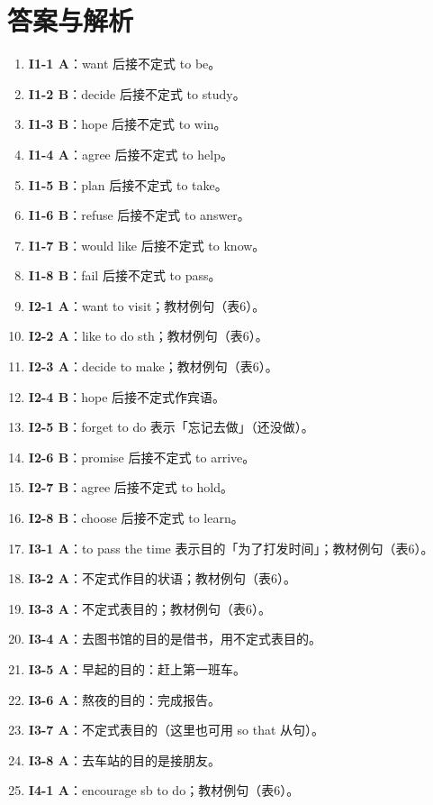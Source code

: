 \documentclass[11pt,a4paper]{ctexart}
\begin{document}
\section*{答案与解析}
\small
\begin{enumerate}[leftmargin=1.6em,itemsep=2pt]
\item \textbf{I1-1 A}：want 后接不定式 to be。
\item \textbf{I1-2 B}：decide 后接不定式 to study。
\item \textbf{I1-3 B}：hope 后接不定式 to win。
\item \textbf{I1-4 A}：agree 后接不定式 to help。
\item \textbf{I1-5 B}：plan 后接不定式 to take。
\item \textbf{I1-6 B}：refuse 后接不定式 to answer。
\item \textbf{I1-7 B}：would like 后接不定式 to know。
\item \textbf{I1-8 B}：fail 后接不定式 to pass。
\item \textbf{I2-1 A}：want to visit；教材例句（表6）。
\item \textbf{I2-2 A}：like to do sth；教材例句（表6）。
\item \textbf{I2-3 A}：decide to make；教材例句（表6）。
\item \textbf{I2-4 B}：hope 后接不定式作宾语。
\item \textbf{I2-5 B}：forget to do 表示「忘记去做」（还没做）。
\item \textbf{I2-6 B}：promise 后接不定式 to arrive。
\item \textbf{I2-7 B}：agree 后接不定式 to hold。
\item \textbf{I2-8 B}：choose 后接不定式 to learn。
\item \textbf{I3-1 A}：to pass the time 表示目的「为了打发时间」；教材例句（表6）。
\item \textbf{I3-2 A}：不定式作目的状语；教材例句（表6）。
\item \textbf{I3-3 A}：不定式表目的；教材例句（表6）。
\item \textbf{I3-4 A}：去图书馆的目的是借书，用不定式表目的。
\item \textbf{I3-5 A}：早起的目的：赶上第一班车。
\item \textbf{I3-6 A}：熬夜的目的：完成报告。
\item \textbf{I3-7 A}：不定式表目的（这里也可用 so that 从句）。
\item \textbf{I3-8 A}：去车站的目的是接朋友。
\item \textbf{I4-1 A}：encourage sb to do；教材例句（表6）。

\end{enumerate}
\end{document}
